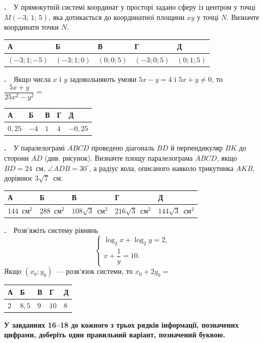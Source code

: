 \documentclass[12pt]{article}
\newcommand{\answerTable}[5]{%
\par\vspace{0.15cm}
\noindent
\begin{tabular}{|*{5}{>{\centering\arraybackslash}m{3cm}|}}
\hline
\rule[-0.15cm]{0pt}{0.6cm}\textbf{А} & \rule[-0.15cm]{0pt}{0.6cm}\textbf{Б} & \rule[-0.15cm]{0pt}{0.6cm}\textbf{В} & \rule[-0.15cm]{0pt}{0.6cm}\textbf{Г} & \rule[-0.15cm]{0pt}{0.6cm}\textbf{Д} \\
\hline
\rule[-0.2cm]{0pt}{0.75cm}#1 & \rule[-0.2cm]{0pt}{0.75cm}#2 & \rule[-0.2cm]{0pt}{0.75cm}#3 & \rule[-0.2cm]{0pt}{0.75cm}#4 & \rule[-0.2cm]{0pt}{0.75cm}#5 \\
\hline
\end{tabular}
\par\vspace{0.25cm}
}
\newcommand{\instructionBox}[1]{%
\par\vspace{0.3cm}
\begin{tcolorbox}[colback=instrBg, colframe=instrBorder, boxrule=0.6pt, arc=2pt,
    left=8pt, right=8pt, top=4pt, bottom=4pt]
\centering\small\bfseries #1
\end{tcolorbox}
\par\vspace{0.15cm}
}
\newcounter{zad}
\newcommand{\zadtask}[1]{\stepcounter{zad}\par\vspace{0.3cm}\noindent\textbf{\thezad.}\ \ #1\par\vspace{0.2cm}}
\newcommand{\zadnum}{\stepcounter{zad}\noindent\textbf{\thezad.}\ \ }
\begin{document}
\zadtask{У прямокутній системі координат у просторі задано сферу із центром у точці $M(-3;\, 1;\, 5)$, яка дотикається до координатної площини $xy$ у точці $N$. Визначте координати точки $N$.}
\answerTable{$(-3; 1; -5)$}{$(-3; 1; 0)$}{$(0; 0; 5)$}{$(-3; 0; 5)$}{$(0; 1; 5)$}

\zadtask{Якщо числа $x$ і $y$ задовольняють умови $5x - y = 4$ і $5x + y \neq 0$, то $\dfrac{5x + y}{25x^2 - y^2} =$}
\answerTable{$0{,}25$}{$-4$}{$1$}{$4$}{$-0{,}25$}

\noindent
\begin{minipage}[c]{0.56\textwidth}
\zadnum У паралелограмі $ABCD$ проведено діагональ $BD$ й перпендикуляр $BK$ до сторони $AD$ (див. рисунок). Визначте площу паралелограма $ABCD$, якщо $BD = 24$~см, $\angle ADB = 30^\circ$, а радіус кола, описаного навколо трикутника $AKB$, дорівнює $3\sqrt{7}$~см.
\end{minipage}%
\hfill
\begin{minipage}[c]{0.42\textwidth}
\centering
{}
\end{minipage}
\par\vspace{0.2cm}
\answerTable{$144$~см$^2$}{$288$~см$^2$}{$108\sqrt{3}$~см$^2$}{$216\sqrt{3}$~см$^2$}{$144\sqrt{3}$~см$^2$}

\zadtask{Розв'яжіть систему рівнянь
\[
\begin{cases} \log_2 x + \log_2 y = 2, \\[2pt] x + \dfrac{1}{y} = 10. \end{cases}
\]
Якщо $(x_0; y_0)$~--- розв'язок системи, то $x_0 + 2y_0 =$}
\answerTable{$2$}{$8{,}5$}{$9$}{$10$}{$8$}
\newpage
\instructionBox{У завданнях 16--18 до кожного з трьох рядків інформації, позначених цифрами, доберіть один правильний варіант, позначений буквою.}
\end{document}
